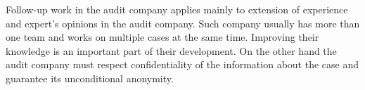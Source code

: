 Follow-up work in the audit company applies mainly to extension of experience and expert's opinions in the audit company. Such company usually has more than one team and works on multiple cases at the same time. Improving their knowledge is an important part of their development. On the other hand the audit company must respect confidentiality of the information about the case and guarantee its unconditional anonymity.


\colorbox{green}{}

